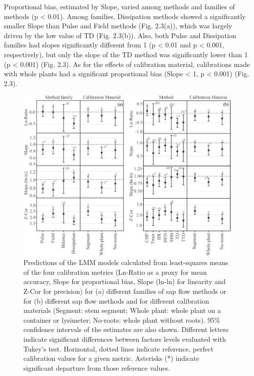 \documentclass[11pt,twoside]{reedthesis}
\begin{document}
Proportional bias, estimated by Slope, varied among methods and families
of methods (p \textless{} 0.01). Among families, Dissipation methods
showed a significantly smaller Slope than Pulse and Field methods (Fig.
2.3(a)), which was largely driven by the low value of TD (Fig. 2.3(b)).
Also, both Pulse and Dissipation families had slopes significantly
different from 1 (p \textless{} 0.01 and p \textless{} 0.001,
respectively), but only the slope of the TD method was significantly
lower than 1 (p \textless{} 0.001) (Fig. 2.3). As for the effects of
calibration material, calibrations made with whole plants had a
significant proportional bias (Slope \textless{} 1, p \textless{} 0.001)
(Fig. 2.3).
\begin{figure}[p]

{\centering \includegraphics[width=1\linewidth]{figure/CH2/FAMILYMETHODS} 

}

\caption[Predictions of the LMM models of the four calibration metrics.]{Predictions of the LMM models calculated from least-squares means of the four calibration metrics (Ln-Ratio as a proxy for mean accuracy, Slope for proportional bias, Slope (ln-ln) for linearity and Z-Cor for precision) for (a) different families of sap flow methods or for (b) different sap flow methods and for different calibration materials (Segment: stem segment; Whole plant: whole plant on a container or lysimeter; No-roots: whole plant without roots). 95\% confidence intervals of the estimates are also shown. Different letters indicate significant differences between factors levels evaluated with Tukey's test. Horizontal, dotted lines indicate reference, perfect calibration values for a given metric. Asterisks (*) indicate significant departure from those reference values.}\label{fig:ch2fig3}
\end{figure}
\end{document}
